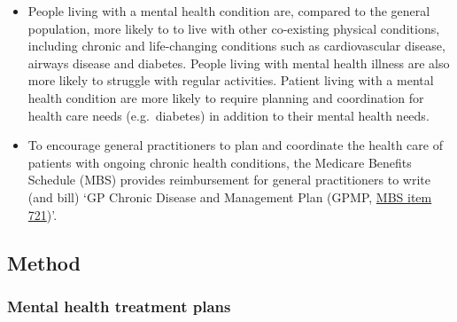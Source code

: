\documentclass[
  letterpaper,
  DIV=11,
  numbers=noendperiod,
  oneside]{scrartcl}
\providecommand{\tightlist}{%
  \setlength{\itemsep}{0pt}\setlength{\parskip}{0pt}}\usepackage{longtable,booktabs,array}
\begin{document}
\begin{itemize}
  \begin{itemize}
  \tightlist
  \item
    People living with a mental health condition are, compared to the
    general population, more likely to to live with other co-existing
    physical conditions, including chronic and life-changing conditions
    such as cardiovascular disease, airways disease and diabetes. People
    living with mental health illness are also more likely to struggle
    with regular activities. Patient living with a mental health condition are more
    likely to require planning and coordination for health care needs
    (e.g.~diabetes) in addition to their mental health needs.
  \item
    To encourage general practitioners to plan and coordinate the health
    care of patients with ongoing chronic health conditions, the
    Medicare Benefits Schedule (MBS) provides reimbursement for general
    practitioners to write (and bill) `GP Chronic Disease and Management
    Plan (GPMP,
    \href{https://www9.health.gov.au/mbs/fullDisplay.cfm?type=item&q=721}{MBS
    item 721})'.
  \end{itemize}
\end{itemize}

\subsection{Method}\label{method}

\subsubsection{Mental health treatment
plans}\label{mental-health-treatment-plans}
\end{document}
